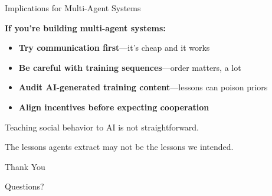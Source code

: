 \documentclass[aspectratio=169]{beamer}
\begin{document}
\begin{frame}{Implications for Multi-Agent Systems}
  
  \textbf{If you're building multi-agent systems:}
  
  \vspace{1em}
  \begin{itemize}
    \item \textbf{Try communication first}---it's cheap and it works
    \item \textbf{Be careful with training sequences}---order matters, a lot
    \item \textbf{Audit AI-generated training content}---lessons can poison priors
    \item \textbf{Align incentives before expecting cooperation}
  \end{itemize}
  
  \vspace{1.5em}
  Teaching social behavior to AI is not straightforward.
  
  \vspace{0.5em}
  The lessons agents extract may not be the lessons we intended.

\end{frame}

\begin{frame}[standout]
  Thank You
  
  \vspace{1em}
  \normalsize
  Questions?
\end{frame}
\end{document}
